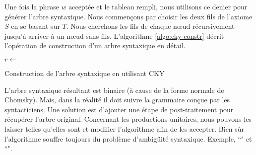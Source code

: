 \documentclass{KodeBook}
\begin{document}
Une fois la phrase $w$ acceptée et le tableau rempli, nous utilisons ce denier pour générer l'arbre syntaxique. 
Nous commençons par choisir les deux fils de l'axiome $S$ en se basant sur $T$.
Nous cherchons les fils de chaque nœud récursivement jusqu'à arriver à un nœud sans fils.
L'algorithme \ref{algo:cky-constr} décrit l'opération de construction d'un arbre syntaxique en détail.
\begin{algorithm}[ht]
	
	
	 {
		$r \leftarrow $ \;
	}
	
	
	\caption{Construction de l'arbre syntaxique en utilisant CKY}
	\label{algo:cky-constr}
\end{algorithm}
%
%	
%	
%	
%		
%	
%	

L'arbre syntaxique résultant est binaire (à cause de la forme normale de Chomsky).
Mais, dans la réalité il doit suivre la grammaire conçue par les syntacticiens. 
Une solution est d'ajouter une étape de post-traitement pour récupérer l'arbre original.
Concernant les productions unitaires, nous pouvons les laisser telles qu'elles sont et modifier l'algorithme  afin de les accepter.
Bien sûr l'algorithme souffre toujours du problème d'ambigüité syntaxique.
Exemple, ``" et ``".
\end{document}
